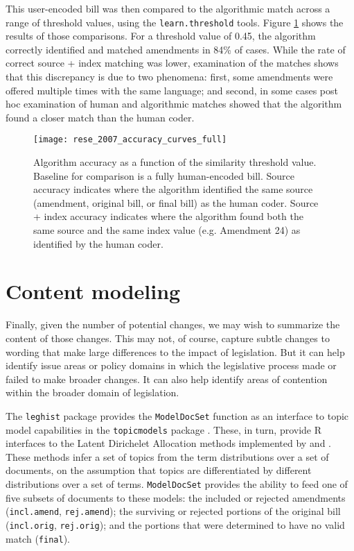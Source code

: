 \documentclass[11pt]{article}
\begin{document}
This user-encoded bill was then compared to the algorithmic match
across a range of threshold values, using the \texttt{learn.threshold}
tools. Figure \ref{fig:rese-accuracy-test} shows the results of those
comparisons. For a threshold value of 0.45, the algorithm correctly
identified and matched amendments in 84\% of cases. While the rate of
correct source + index matching was lower, examination of the matches
shows that this discrepancy is due to two phenomena: first, some
amendments were offered multiple times with the same language; and
second, in some cases post hoc examination of human and algorithmic
matches showed that the algorithm found a closer match than the human
coder.

\begin{figure}[ht]
  \centering
  \texttt{[image: rese\_2007\_accuracy\_curves\_full]}
  \caption{Algorithm accuracy as a function of the similarity threshold value. Baseline for comparison is a fully human-encoded bill. Source accuracy indicates where the algorithm identified the same source (amendment, original bill, or final bill) as the human coder. Source + index accuracy indicates where the algorithm found both the same source and the same index value (e.g. Amendment 24) as identified by the human coder.  }
  \label{fig:rese-accuracy-test}
\end{figure}

\section{Content modeling}
\label{sec:content-modeling}

Finally, given the number of potential changes, we may wish to
summarize the content of those changes. This may not, of course,
capture subtle changes to wording that make large differences to the
impact of legislation. But it can help identify issue areas or policy
domains in which the legislative process made or failed to make
broader changes. It can also help identify areas of contention within
the broader domain of legislation. 

The \texttt{leghist} package provides the \texttt{ModelDocSet}
function as an interface to topic model capabilities in the
\texttt{topicmodels} package \citep{grun2011topicmodels}. These, in
turn, provide R interfaces to the Latent Dirichelet Allocation methods
implemented by \cite{blei2003latent} and
\cite{blei2006correlated}. These methods infer a set of topics from
the term distributions over a set of documents, on the assumption that
topics are differentiated by different distributions over a set of
terms. \texttt{ModelDocSet} provides the ability to feed one of five
subsets of documents to these models: the included or rejected
amendments (\texttt{incl.amend}, \texttt{rej.amend}); the surviving or rejected portions of the original
bill (\texttt{incl.orig}, \texttt{rej.orig}); and the portions that
were determined to have no valid match (\texttt{final}). 
\end{document}
